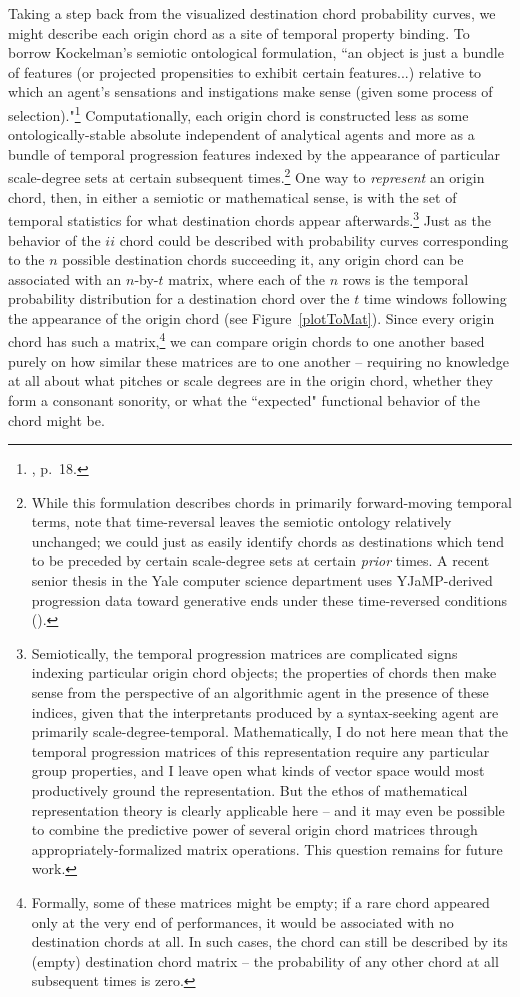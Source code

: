 Taking a step back from the visualized destination chord probability curves, we might describe each origin chord as a site of temporal property binding.  To borrow Kockelman's semiotic ontological formulation, ``an object is just a bundle of features (or projected propensities to exhibit certain features...) relative to which an agent's sensations and instigations make sense (given some process of selection)."\footnote{\cite{kockelman2013}, p.\ 18.}  Computationally, each origin chord is constructed less as some ontologically-stable absolute independent of analytical agents and more as a bundle of temporal progression features indexed by the appearance of particular scale-degree sets at certain subsequent times.\footnote{While this formulation describes chords in primarily forward-moving temporal terms, note that time-reversal leaves the semiotic ontology relatively unchanged; we could just as easily identify chords as destinations which tend to be preceded by certain scale-degree sets at certain \emph{prior} times.  A recent senior thesis in the Yale computer science department uses YJaMP-derived progression data toward generative ends under these time-reversed conditions (\cite{zitomer2016}).}  One way to \emph{represent} an origin chord, then, in either a semiotic or mathematical sense, is with the set of temporal statistics for what destination chords appear afterwards.\footnote{Semiotically, the temporal progression matrices are complicated signs indexing particular origin chord objects; the properties of chords then make sense from the perspective of an algorithmic agent in the presence of these indices, given that the interpretants produced by a syntax-seeking agent are primarily scale-degree-temporal.  Mathematically, I do not here mean that the temporal progression matrices of this representation require any particular group properties, and I leave open what kinds of vector space would most productively ground the representation.  But the ethos of mathematical representation theory is clearly applicable here -- and it may even be possible to combine the predictive power of several origin chord matrices through appropriately-formalized matrix operations.  This question remains for future work.}  Just as the behavior of the $ii$ chord could be described with probability curves corresponding to the $n$ possible destination chords succeeding it, any origin chord can be associated with an $n$-by-$t$ matrix, where each of the $n$ rows is the temporal probability distribution for a destination chord over the $t$ time windows following the appearance of the origin chord (see Figure~\ref{plotToMat}).  Since every origin chord has such a matrix,\footnote{Formally, some of these matrices might be empty; if a rare chord appeared only at the very end of performances, it would be associated with no destination chords at all.  In such cases, the chord can still be described by its (empty) destination chord matrix -- the probability of any other chord at all subsequent times is zero.} we can compare origin chords to one another based purely on how similar these matrices are to one another -- requiring no knowledge at all about what pitches or scale degrees are in the origin chord, whether they form a consonant sonority, or what the ``expected" functional behavior of the chord might be.


